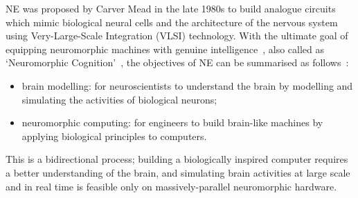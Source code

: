 NE was proposed by Carver Mead in the late 1980s \citep{Mead:1989:AVN:64998} to build analogue circuits which mimic biological neural cells and the architecture of the nervous system using Very-Large-Scale Integration (VLSI) technology.
With the ultimate goal of equipping neuromorphic machines with genuine intelligence~\citep{konar1999artificial}, also called as `Neuromorphic Cognition'~\citep{indiveri2009artificial}, the objectives of NE can be summarised as follows~\citep{furber2007neural}:
\begin{itemize}
	\item brain modelling: for neuroscientists to understand the brain by modelling and simulating the activities of biological neurons; 
	\item neuromorphic computing: for engineers to build brain-like machines by applying biological principles to computers.
\end{itemize}
This is a bidirectional process; building a biologically inspired computer requires a better understanding of the brain, and simulating brain activities at large scale and in real time is feasible only on massively-parallel neuromorphic hardware.




